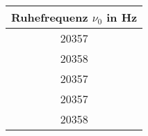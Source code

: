 \begin{center}
\begin{tabular}{c}
	Ruhefrequenz $\nu_0$ in Hz \\
	\hline
	20357 \\
	20358 \\
	20357 \\
	20357 \\
	20358 \\
\end{tabular}
\end{center}